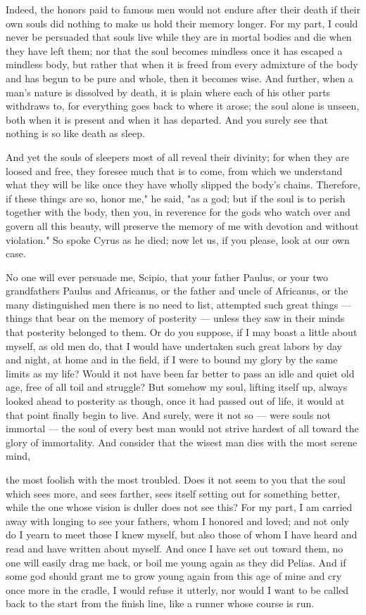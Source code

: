  Indeed, the honors paid to famous men would not endure after their death if their own souls did nothing to make us hold their memory longer. For my part, I could never be persuaded that souls live while they are in mortal bodies and die when they have left them; nor that the soul becomes mindless once it has escaped a mindless body, but rather that when it is freed from every admixture of the body and has begun to be pure and whole, then it becomes wise. And further, when a man's nature is dissolved by death, it is plain where each of his other parts withdraws to, for everything goes back to where it arose; the soul alone is unseen, both when it is present and when it has departed. And you surely see that nothing is so like death as sleep.

 And yet the souls of sleepers most of all reveal their divinity; for when they are loosed and free, they foresee much that is to come, from which we understand what they will be like once they have wholly slipped the body's chains. Therefore, if these things are so, honor me," he said, "as a god; but if the soul is to perish together with the body, then you, in reverence for the gods who watch over and govern all this beauty, will preserve the memory of me with devotion and without violation." So spoke Cyrus as he died; now let us, if you please, look at our own case.

 No one will ever persuade me, Scipio, that your father Paulus, or your two grandfathers Paulus and Africanus, or the father and uncle of Africanus, or the many distinguished men there is no need to list, attempted such great things — things that bear on the memory of posterity — unless they saw in their minds that posterity belonged to them. Or do you suppose, if I may boast a little about myself, as old men do, that I would have undertaken such great labors by day and night, at home and in the field, if I were to bound my glory by the same limits as my life? Would it not have been far better to pass an idle and quiet old age, free of all toil and struggle? But somehow my soul, lifting itself up, always looked ahead to posterity as though, once it had passed out of life, it would at that point finally begin to live. And surely, were it not so — were souls not immortal — the soul of every best man would not strive hardest of all toward the glory of immortality. And consider that the wisest man dies with the most serene mind,

 the most foolish with the most troubled. Does it not seem to you that the soul which sees more, and sees farther, sees itself setting out for something better, while the one whose vision is duller does not see this? For my part, I am carried away with longing to see your fathers, whom I honored and loved; and not only do I yearn to meet those I knew myself, but also those of whom I have heard and read and have written about myself. And once I have set out toward them, no one will easily drag me back, or boil me young again as they did Pelias. And if some god should grant me to grow young again from this age of mine and cry once more in the cradle, I would refuse it utterly, nor would I want to be called back to the start from the finish line, like a runner whose course is run.

